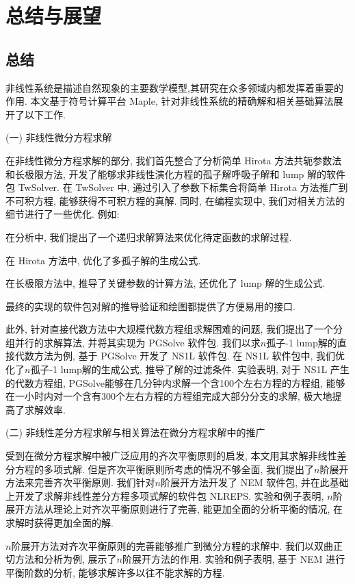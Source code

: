 \chapter{总结与展望}\label{ch07}
\section{总结}
非线性系统是描述自然现象的主要数学模型,其研究在众多领域内都发挥着重要的作用. 本文基于符号计算平台 Maple, 针对非线性系统的精确解和相关基础算法展开了以下工作.

(一) 非线性微分方程求解

在非线性微分方程求解的部分, 我们首先整合了\Painleve{}分析\D 简单 Hirota 方法\D 共轭参数法和长极限方法, 开发了能够求非线性演化方程的孤子解\D 呼吸子解和 lump 解的软件包 TwSolver. 在 TwSolver 中, 通过引入了参数下标集合将简单 Hirota 方法推广到不可积方程, 能够获得不可积方程的真解. 同时, 在编程实现中, 我们对相关方法的细节进行了一些优化. 例如:
\begin{compactenum}[(1)]
\item 在\Painleve{}分析中, 我们提出了一个递归求解算法来优化待定函数的求解过程.
\item 在 Hirota 方法中, 优化了多孤子解的生成公式.
\item 在长极限方法中, 推导了关键参数的计算方法, 还优化了 lump 解的生成公式.
\item 最终的实现的软件包对解的推导\D 验证和绘图都提供了方便易用的接口. 
\end{compactenum}

此外, 针对直接代数方法中大规模代数方程组求解困难的问题, 我们提出了一个分组并行的求解算法, 并将其实现为 PGSolve 软件包. 我们以求$n$孤子-1 lump解的直接代数方法为例, 基于 PGSolve 开发了 NS1L 软件包. 在 NS1L 软件包中, 我们优化了$n$孤子-1 lump解的生成公式, 推导了解的过滤条件. 实验表明, 对于 NS1L 产生的代数方程组, PGSolve能够在几分钟内求解一个含100个左右方程的方程组, 能够在一小时内对一个含有300个左右方程的方程组完成大部分分支的求解, 极大地提高了求解效率.

(二) 非线性差分方程求解与相关算法在微分方程求解中的推广

受到在微分方程求解中被广泛应用的齐次平衡原则的启发, 本文用其求解非线性差分方程的多项式解. 但是齐次平衡原则所考虑的情况不够全面, 我们提出了$n$阶展开方法来完善齐次平衡原则. 我们针对$n$阶展开方法开发了 NEM 软件包, 并在此基础上开发了求解非线性差分方程多项式解的软件包 NLREPS. 实验和例子表明, $n$阶展开方法从理论上对齐次平衡原则进行了完善, 能更加全面的分析平衡的情况, 在求解时获得更加全面的解. 

$n$阶展开方法对齐次平衡原则的完善能够推广到微分方程的求解中. 我们以双曲正切方法和\Painleve{}分析为例, 展示了$n$阶展开方法的作用. 实验和例子表明, 基于 NEM 进行平衡阶数的分析, 能够求解许多以往不能求解的方程. 

